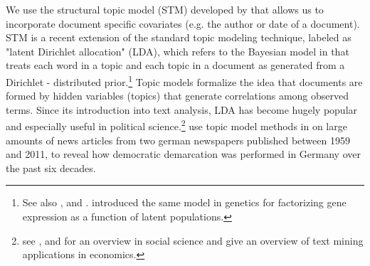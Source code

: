\documentclass[12pt,a4paper,notitlepage]{article}
\begin{document}
We use the structural topic model (STM) developed by \citet{roberts_model_2016} that allows us to incorporate document specific covariates (e.g. the author or date of a document). STM is a recent extension of the standard topic modeling technique, labeled as "latent Dirichlet allocation" (LDA), which refers to the Bayesian model in \citet{blei_latent_2003} that treats each word in a topic and each topic in a document as generated from a Dirichlet - distributed prior.\footnote{See also \citet{griffiths_probabilistic_2002}, \citet{griffiths_finding_2004} and \citet{hofmann_probabilistic_1999}. \citet{pritchard_inference_2000} introduced the same model in genetics for factorizing gene expression as a function of latent populations.} Topic models formalize the idea that documents are formed by hidden variables (topics) that generate correlations among observed terms. Since its introduction into text analysis, LDA has become hugely popular and especially useful in political science.\footnote{see \citet{blei_probabilistic_2012}, \citet{grimmer_text_2013} and \citet{wiedmann_text_2016} for an overview in social science and \citet{gentzkow_text_2017} give an overview of text mining applications in economics.} \citet{wiedmann_text_2016} use topic model methods in on large amounts of news articles from two german newspapers published between 1959 and 2011, to reveal how democratic demarcation was performed in Germany over the past six decades. 
\end{document}
